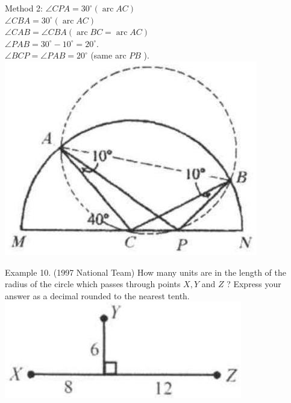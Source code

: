 \documentclass[10pt]{article}
\begin{document}
Method 2:
\(\angle C P A=30^{\circ}(\operatorname{arc} A C)\)\\
\(\angle C B A=30^{\circ}(\operatorname{arc} A C)\)\\
\(\angle C A B=\angle C B A(\operatorname{arc} B C=\operatorname{arc} A C)\)\\
\(\angle P A B=30^{\circ}-10^{\circ}=20^{\circ}\).\\
\(\angle B C P=\angle P A B=20^{\circ}\) (same arc \(P B\) ).\\
\includegraphics[max width=\textwidth, center]{2025_04_17_97bc1f7e44d93c271a88g-204(1)}

Example 10. (1997 National Team) How many units are in the length of the radius of the circle which passes through points \(X, Y\) and \(Z\) ? Express your answer as a decimal rounded to the nearest tenth.\\
\includegraphics[max width=\textwidth, center]{2025_04_17_97bc1f7e44d93c271a88g-204}
\end{document}
